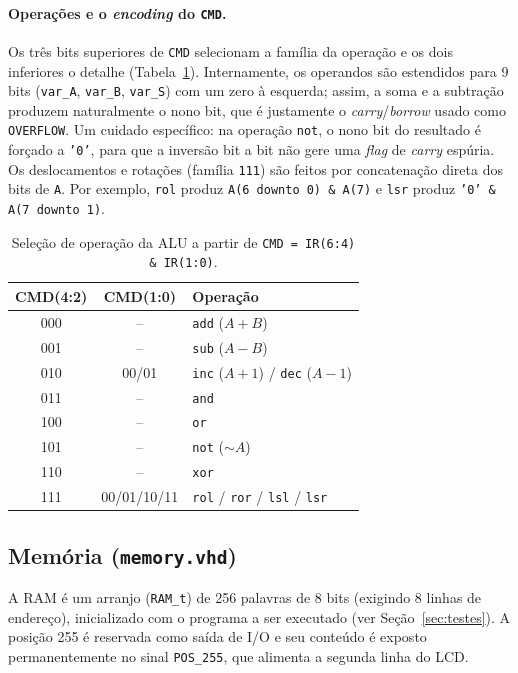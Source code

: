 \documentclass[12pt,a4paper]{article}
\begin{document}
\paragraph{Operações e o \textit{encoding} do \texttt{CMD}.}
Os três bits superiores de \texttt{CMD} selecionam a família da operação e os dois inferiores
o detalhe (Tabela~\ref{tab:aluops}). Internamente, os operandos são estendidos para 9 bits
(\texttt{var\_A}, \texttt{var\_B}, \texttt{var\_S}) com um zero à esquerda; assim, a soma e a
subtração produzem naturalmente o nono bit, que é justamente o \textit{carry}/\textit{borrow}
usado como \texttt{OVERFLOW}. Um cuidado específico: na operação \texttt{not}, o nono bit do
resultado é forçado a \texttt{'0'}, para que a inversão bit a bit não gere uma \textit{flag}
de \textit{carry} espúria. Os deslocamentos e rotações (família \texttt{111}) são feitos por
concatenação direta dos bits de \texttt{A}. Por exemplo, \texttt{rol} produz
\texttt{A(6\,downto\,0)\,\&\,A(7)} e \texttt{lsr} produz \texttt{'0'\,\&\,A(7\,downto\,1)}.

\begin{table}[H]
\centering
\small
\begin{tabular}{ccl}
\hline
\textbf{CMD(4:2)} & \textbf{CMD(1:0)} & \textbf{Operação} \\
\hline
000 & --  & \texttt{add} ($A+B$) \\
001 & --  & \texttt{sub} ($A-B$) \\
010 & 00/01 & \texttt{inc} ($A+1$) / \texttt{dec} ($A-1$) \\
011 & --  & \texttt{and} \\
100 & --  & \texttt{or} \\
101 & --  & \texttt{not} ($\sim A$) \\
110 & --  & \texttt{xor} \\
111 & 00/01/10/11 & \texttt{rol} / \texttt{ror} / \texttt{lsl} / \texttt{lsr} \\
\hline
\end{tabular}
\caption{Seleção de operação da ALU a partir de \texttt{CMD = IR(6:4) \& IR(1:0)}.}
\label{tab:aluops}
\end{table}

\subsection{Memória (\texttt{memory.vhd})}
\label{sec:memory}

A RAM é um arranjo (\texttt{RAM\_t}) de 256 palavras de 8 bits (exigindo 8 linhas de
endereço), inicializado com o programa a ser executado (ver Seção~\ref{sec:testes}). A
posição 255 é reservada como saída de I/O e seu conteúdo é exposto permanentemente no sinal
\texttt{POS\_255}, que alimenta a segunda linha do LCD.
\end{document}
